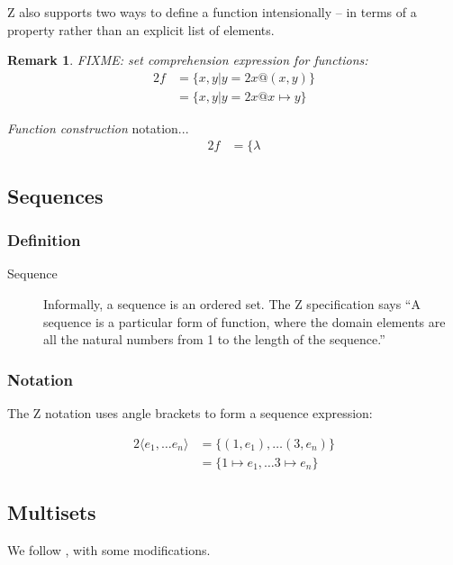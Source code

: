 \documentclass[reqno,12pt]{article}
\numberwithin{equation}{subsection}
\newtheorem{remark}{Remark}
\begin{document}
Z also supports two ways to define a function intensionally -- in
terms of a property rather than an explicit list of elements.

\begin{remark}
FIXME: set comprehension expression for functions:
\begin{alignat}{2}
  f &= \{x,y | y=2x @ (x,y)\} \\
  &= \{x,y | y=2x @ x\mapsto y\}
\end{alignat}
\end{remark}

\textit{Function construction} notation...
\begin{alignat}{2}
  f &= \{\lambda
\end{alignat}


\subsection{Sequences}

\subsubsection{Definition}

\begin{description}
\item [Sequence] Informally, a sequence is an ordered set.  The Z
  specification says ``A sequence is a particular form of function,
  where the domain elements are all the natural numbers from 1 to the
  length of the sequence.''
\end{description}

\subsubsection{Notation}

The Z notation uses angle brackets to form a sequence expression:

\begin{alignat}{2}
  \langle e_1,\ldots e_n\rangle &= \{(1,e_1),\ldots (3,e_n)\} \\
  &= \{1\mapsto e_1,\ldots 3\mapsto e_n\}
\end{alignat}

\subsection{Multisets}

We follow \parencite{singh_overview_2007}, with some modifications.
\end{document}
